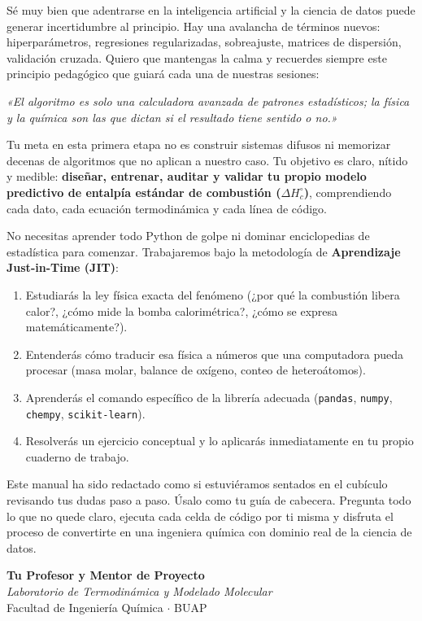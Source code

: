 \documentclass[11pt,letterpaper]{report}
\begin{document}
Sé muy bien que adentrarse en la inteligencia artificial y la ciencia de datos puede generar incertidumbre al principio. Hay una avalancha de términos nuevos: hiperparámetros, regresiones regularizadas, sobreajuste, matrices de dispersión, validación cruzada. Quiero que mantengas la calma y recuerdes siempre este principio pedagógico que guiará cada una de nuestras sesiones:
\begin{center}
    \textit{«El algoritmo es solo una calculadora avanzada de patrones estadísticos; la física y la química son las que dictan si el resultado tiene sentido o no.»}
\end{center}

Tu meta en esta primera etapa no es construir sistemas difusos ni memorizar decenas de algoritmos que no aplican a nuestro caso. Tu objetivo es claro, nítido y medible: \textbf{diseñar, entrenar, auditar y validar tu propio modelo predictivo de entalpía estándar de combustión ($\Delta H_c^\circ$)}, comprendiendo cada dato, cada ecuación termodinámica y cada línea de código.

No necesitas aprender todo Python de golpe ni dominar enciclopedias de estadística para comenzar. Trabajaremos bajo la metodología de \textbf{Aprendizaje Just-in-Time (JIT)}:
\begin{enumerate}[leftmargin=*]
    \item Estudiarás la ley física exacta del fenómeno (¿por qué la combustión libera calor?, ¿cómo mide la bomba calorimétrica?, ¿cómo se expresa matemáticamente?).
    \item Entenderás cómo traducir esa física a números que una computadora pueda procesar (masa molar, balance de oxígeno, conteo de heteroátomos).
    \item Aprenderás el comando específico de la librería adecuada (\texttt{pandas}, \texttt{numpy}, \texttt{chempy}, \texttt{scikit-learn}).
    \item Resolverás un ejercicio conceptual y lo aplicarás inmediatamente en tu propio cuaderno de trabajo.
\end{enumerate}

Este manual ha sido redactado como si estuviéramos sentados en el cubículo revisando tus dudas paso a paso. Úsalo como tu guía de cabecera. Pregunta todo lo que no quede claro, ejecuta cada celda de código por ti misma y disfruta el proceso de convertirte en una ingeniera química con dominio real de la ciencia de datos.

\vspace{0.6cm}
\begin{flushright}
    \textbf{Tu Profesor y Mentor de Proyecto}\\
    \textit{Laboratorio de Termodinámica y Modelado Molecular}\\
    Facultad de Ingeniería Química $\cdot$ BUAP
\end{flushright}
\end{document}
